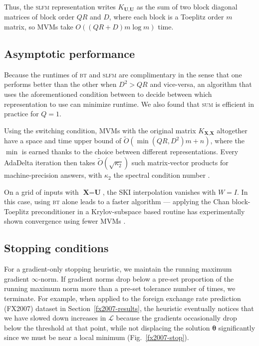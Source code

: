 \documentclass{article}
\def\bsth{{\boldsymbol\theta}}
\def \mcL {\mathcal{L}}
\def\TX{\textbf{X}}
\def\TU{\textbf{U}}
\begin{document}
Thus, the \textsc{slfm} representation writes $K_{\TU,\TU}$ as the sum of two block diagonal matrices of block order $QR$ and $D$, where each block is a Toeplitz order $m$ matrix, so MVMs take $O((QR + D)m\log m)$ time.

\subsection{Asymptotic performance}

Because the runtimes of \textsc{bt} and \textsc{slfm} are complimentary in the sense that one performs better than the other when $D^2>QR$ and vice-versa, an algorithm that uses the aforementioned condition between to decide between which representation to use can minimize runtime. We also found that \textsc{sum} is efficient in practice for $Q=1$.

Using the switching condition, MVMs with the original matrix $K_{\TX,\TX}$ altogether have a space and time upper bound of $\tilde{O}(\min(QR,D^2)m+n)$, where the $\min$ is earned thanks to the choice between different representations. Every AdaDelta iteration then takes $\tilde{O}(\sqrt{\kappa_2})$ such matrix-vector products for machine-precision answers, with $\kappa_2$ the spectral condition number \cite{raykar2007fast}.

On a grid of inputs with $\TX=\TU$, the SKI interpolation vanishes with $W=I$. In this case, using \textsc{bt} alone leads to a faster algorithm --- applying the Chan block-Toeplitz preconditioner in a Krylov-subspace based routine has experimentally shown convergence using fewer MVMs \cite{chan1994circulant}.

\subsection{Stopping conditions}\label{stopping}

For a gradient-only stopping heuristic, we maintain the running maximum gradient $\infty$-norm. If gradient norms drop below a pre-set proportion of the running maximum norm more than a pre-set tolerance number of times, we terminate. For example, when applied to the foreign exchange rate prediction (FX2007) dataset in Section~\ref{fx2007-results}, the heuristic eventually notices that we have slowed down increases in $\mcL$ because the gradients occasionally drop below the threshold at that point, while not displacing the solution $\bsth$ significantly since we must be near a local minimum (Fig.~\ref{fx2007-stop}). 
\end{document}
